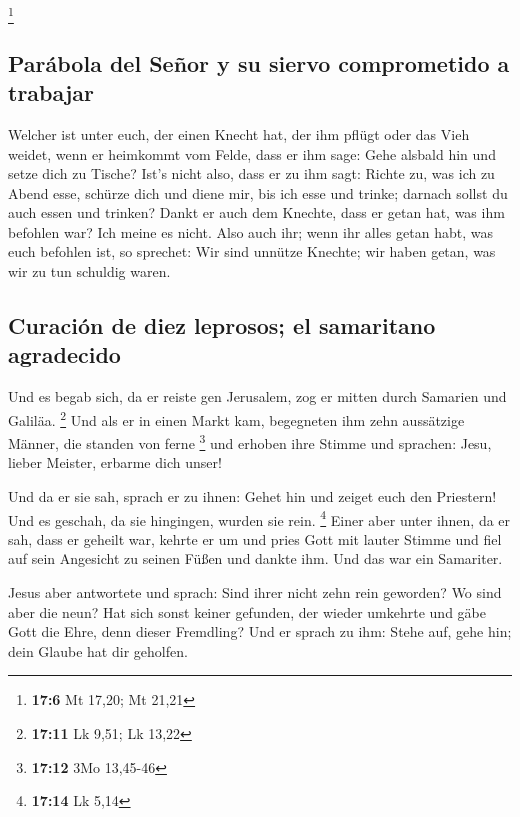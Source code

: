 \footnote{\textbf{17:6} Mt 17,20; Mt 21,21}

\hypertarget{paruxe1bola-del-seuxf1or-y-su-siervo-comprometido-a-trabajar}{%
\subsection{Parábola del Señor y su siervo comprometido a
trabajar}\label{paruxe1bola-del-seuxf1or-y-su-siervo-comprometido-a-trabajar}}

 Welcher ist unter euch, der einen Knecht hat, der ihm
pflügt oder das Vieh weidet, wenn er heimkommt vom Felde, dass er ihm
sage: Gehe alsbald hin und setze dich zu Tische?  Ist's
nicht also, dass er zu ihm sagt: Richte zu, was ich zu Abend esse,
schürze dich und diene mir, bis ich esse und trinke; darnach sollst du
auch essen und trinken?  Dankt er auch dem Knechte, dass
er getan hat, was ihm befohlen war? Ich meine es nicht. 
Also auch ihr; wenn ihr alles getan habt, was euch befohlen ist, so
sprechet: Wir sind unnütze Knechte; wir haben getan, was wir zu tun
schuldig waren.

\hypertarget{curaciuxf3n-de-diez-leprosos-el-samaritano-agradecido}{%
\subsection{Curación de diez leprosos; el samaritano
agradecido}\label{curaciuxf3n-de-diez-leprosos-el-samaritano-agradecido}}

 Und es begab sich, da er reiste gen Jerusalem, zog er
mitten durch Samarien und Galiläa. \footnote{\textbf{17:11} Lk 9,51; Lk
  13,22}  Und als er in einen Markt kam, begegneten ihm
zehn aussätzige Männer, die standen von ferne \footnote{\textbf{17:12}
  3Mo 13,45-46}  und erhoben ihre Stimme und sprachen:
Jesu, lieber Meister, erbarme dich unser!

 Und da er sie sah, sprach er zu ihnen: Gehet hin und
zeiget euch den Priestern! Und es geschah, da sie hingingen, wurden sie
rein. \footnote{\textbf{17:14} Lk 5,14}  Einer aber unter
ihnen, da er sah, dass er geheilt war, kehrte er um und pries Gott mit
lauter Stimme  und fiel auf sein Angesicht zu seinen
Füßen und dankte ihm. Und das war ein Samariter.

 Jesus aber antwortete und sprach: Sind ihrer nicht zehn
rein geworden? Wo sind aber die neun?  Hat sich sonst
keiner gefunden, der wieder umkehrte und gäbe Gott die Ehre, denn dieser
Fremdling?  Und er sprach zu ihm: Stehe auf, gehe hin;
dein Glaube hat dir geholfen.

